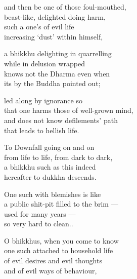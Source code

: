 \begin{MyDescription}{}
and then be one of those foul-mouthed,\\
beast-like, delighted doing harm,\\
such a one's of evil life\\
increasing `dust' within himself,
\end{MyDescription}

\begin{MyDescription}{}
a bhikkhu delighting in quarrelling\\
while in delusion wrapped\\
knows not the Dharma even when\\
its by the Buddha pointed out;
\end{MyDescription}   

\begin{MyDescription}{}
led along by ignorance so\\
that one harms those of well-grown mind,\\
and does not know defilements' path\\
that leads to hellish life.
\end{MyDescription}   

\begin{MyDescription}{}
To Downfall going on and on\\
from life to life, from dark to dark,\\
a bhikkhu such as this indeed\\
hereafter to dukkha descends.
\end{MyDescription}  

\begin{MyDescription}{}
One such with blemishes is like\\
a public shit-pit ﬁlled to the brim —\\
used for many years —\\
so very hard to clean..
\end{MyDescription}  

\begin{MyDescription}{}
O bhikkhus, when you come to know\\
one such attached to household life ~\\
of evil desires and evil thoughts\\
and of evil ways of behaviour,
\end{MyDescription}  


